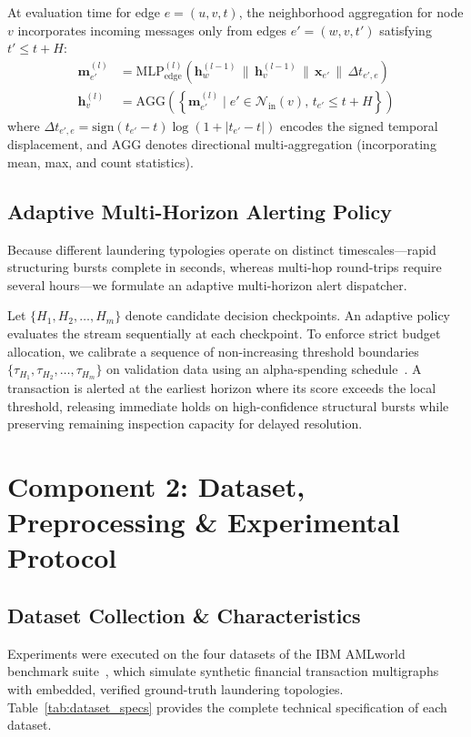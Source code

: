 \documentclass[11pt,a4paper]{article}
\begin{document}
At evaluation time for edge $e=(u, v, t)$, the neighborhood aggregation for node $v$ incorporates incoming messages only from edges $e'=(w, v, t')$ satisfying $t' \le t + H$:
\begin{align}
\mathbf{m}_{e'}^{(l)} &= \text{MLP}_{\text{edge}}^{(l)}\left(\mathbf{h}_w^{(l-1)} \,\|\, \mathbf{h}_v^{(l-1)} \,\|\, \mathbf{x}_{e'} \,\|\, \Delta t_{e', e}\right) \\
\mathbf{h}_v^{(l)} &= \text{AGG}\left(\left\{\mathbf{m}_{e'}^{(l)} \mid e' \in \mathcal{N}_{\text{in}}(v), \, t_{e'} \le t + H\right\}\right)
\end{align}
where $\Delta t_{e', e} = \text{sign}(t_{e'} - t)\log(1 + |t_{e'} - t|)$ encodes the signed temporal displacement, and $\text{AGG}$ denotes directional multi-aggregation (incorporating mean, max, and count statistics).

\subsection{Adaptive Multi-Horizon Alerting Policy}
Because different laundering typologies operate on distinct timescales—rapid structuring bursts complete in seconds, whereas multi-hop round-trips require several hours—we formulate an adaptive multi-horizon alert dispatcher. 

Let $\{H_1, H_2, \dots, H_m\}$ denote candidate decision checkpoints. An adaptive policy evaluates the stream sequentially at each checkpoint. To enforce strict budget allocation, we calibrate a sequence of non-increasing threshold boundaries $\{\tau_{H_1}, \tau_{H_2}, \dots, \tau_{H_m}\}$ on validation data using an alpha-spending schedule~\cite{lan1983alpha}. A transaction is alerted at the earliest horizon where its score exceeds the local threshold, releasing immediate holds on high-confidence structural bursts while preserving remaining inspection capacity for delayed resolution.

\section{Component 2: Dataset, Preprocessing \& Experimental Protocol}
\label{sec:comp2_dataset}

\subsection{Dataset Collection \& Characteristics}
Experiments were executed on the four datasets of the IBM AMLworld benchmark suite~\cite{altman2023ibmaml}, which simulate synthetic financial transaction multigraphs with embedded, verified ground-truth laundering topologies. Table~\ref{tab:dataset_specs} provides the complete technical specification of each dataset.
\end{document}

